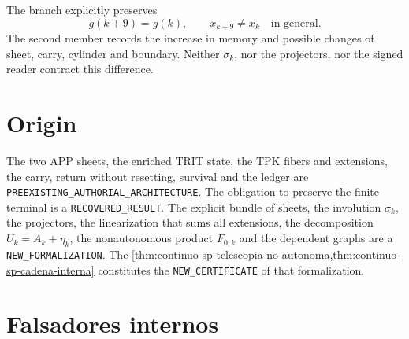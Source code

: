 The branch explicitly preserves
\begin{equation}
\label{eq:continuo-sp-no-reset}
 g(k+9)=g(k),
 \qquad
 x_{k+9}\neq x_k\quad\text{in general}.
\end{equation}
The second member records the increase in memory and possible changes
of sheet, carry, cylinder and boundary. Neither \(\sigma_k\), nor the projectors, nor
the signed reader contract this difference.

\iffalse
\section{Origin}

The two APP sheets, the enriched TRIT state, the TPK fibers and extensions,
the carry, return without resetting, survival and the ledger are
\texttt{PREEXISTING\_AUTHORIAL\_ARCHITECTURE}. The obligation to preserve the
finite terminal is a \texttt{RECOVERED\_RESULT}. The explicit bundle of sheets,
the involution \(\sigma_k\), the projectors, the linearization that sums all
extensions, the decomposition \(U_k=A_k+\eta_k\), the nonautonomous
product \(F_{0,k}\) and the dependent graphs are a
\texttt{NEW\_FORMALIZATION}. The
\cref{thm:continuo-sp-telescopia-no-autonoma,thm:continuo-sp-cadena-interna}
constitutes the \texttt{NEW\_CERTIFICATE} of that formalization.

\section{Falsadores internos}

